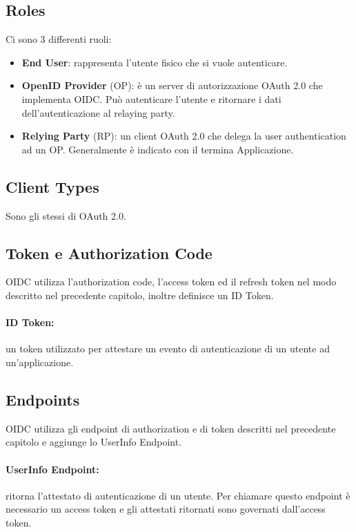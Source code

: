 \subsection{Roles}

Ci sono 3 differenti ruoli:

\begin{itemize}
    \item \textbf{End User}: rappresenta l'utente fisico che si vuole autenticare.
    \item \textbf{OpenID Provider} (OP): è un server di autorizzazione OAuth 2.0 che
          implementa OIDC. Può autenticare l'utente e ritornare i dati dell'autenticazione
          al relaying party.
    \item \textbf{Relying Party} (RP): un client OAuth 2.0 che delega la user
          authentication
          ad un OP. Generalmente è indicato con il termina Applicazione.
\end{itemize}

\subsection{Client Types}

Sono gli stessi di OAuth 2.0.

\subsection{Token e Authorization Code}

OIDC utilizza l'authorization code, l'access token ed il refresh token nel modo descritto
nel precedente capitolo, inoltre definisce un ID Token.

\paragraph{ID Token:} un token utilizzato per attestare un evento di autenticazione
di un utente ad un'applicazione.

\subsection{Endpoints}

OIDC utilizza gli endpoint di authorization e di token descritti nel precedente capitolo
e aggiunge lo UserInfo Endpoint.

\paragraph{UserInfo Endpoint:} ritorna l'attestato di autenticazione di un utente.
Per chiamare questo endpoint è necessario un access token e gli attestati ritornati
sono governati dall'access token.

